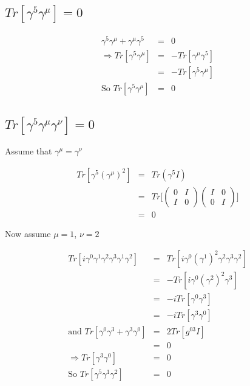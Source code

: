 \subsection{\texorpdfstring{$Tr[\gamma^5\gamma^{\mu}] = 0$}{TrG5GMu}}

\begin{eqnarray*}
  \gamma^5\gamma^{\mu} + \gamma^{\mu}\gamma^5 & = & 0 \\
  \Rightarrow Tr[\gamma^5\gamma^{\mu}] & = & -Tr[\gamma^{\mu}\gamma^5] \\
  & = & -Tr[\gamma^5\gamma^{\mu}] \\
  \textrm{So } Tr[\gamma^5\gamma^{\mu}] & = & 0
\end{eqnarray*}

\subsection{\texorpdfstring{$Tr[\gamma^{5}\gamma^{\mu}\gamma^{\nu}] = 0$}{TrG5GMuGNu}}

Assume that $\gamma^{\mu} = \gamma^{\nu}$

\begin{eqnarray*}
  Tr[\gamma^5\left(\gamma^{\mu}\right)^2] & = & Tr (\gamma^5 I) \\
  & = & Tr
  \Bigg[
  \left(
    \begin{array}{cc}
    0 & I \\
    I & 0
    \end{array}
  \right)
  \left(
    \begin{array}{cc}
    I & 0 \\
    0 & I
    \end{array}
  \right)
  \Bigg]
  \\
  & = & 0
\end{eqnarray*}

Now assume $\mu = 1$, $\nu = 2$

\begin{eqnarray*}
  Tr[i\gamma^0\gamma^1\gamma^2\gamma^3\gamma^1\gamma^2] & = & Tr[i\gamma^0\left(\gamma^1\right)^2\gamma^2\gamma^3\gamma^2 ] \\
  & = & -Tr[i\gamma^0\left(\gamma^2\right)^2\gamma^3] \\
  & = & -iTr[\gamma^0\gamma^3] \\
  & = & -iTr[\gamma^3\gamma^0] \\
  \textrm{and } Tr[\gamma^0\gamma^3 + \gamma^3\gamma^0] & = & 2Tr[g^{03}I] \\
  & = & 0 \\
  \Rightarrow Tr[\gamma^3\gamma^0] & = & 0 \\
  \textrm{So } Tr[\gamma^5\gamma^1\gamma^2] & = & 0
\end{eqnarray*}

